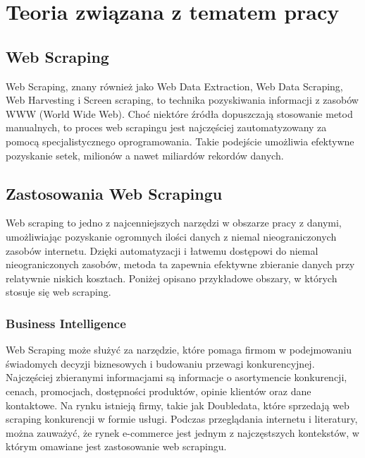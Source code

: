 \newpage

\section{Teoria związana z tematem pracy}\label{sec:teoria}

\subsection{Web Scraping}\label{subsec:web-scraping}

Web Scraping, znany również jako Web Data Extraction, Web Data Scraping, Web Harvesting i Screen scraping, to technika pozyskiwania informacji z zasobów WWW (World Wide Web)\cite{Zhao2017}.
Choć niektóre źródła dopuszczają stosowanie metod manualnych\cite{applications-and-tools}, to proces web scrapingu jest najczęściej zautomatyzowany za pomocą specjalistycznego oprogramowania.
Takie podejście umożliwia efektywne pozyskanie setek, milionów a nawet miliardów rekordów danych.

\subsection{Zastosowania Web Scrapingu}\label{subsec:web-scraping-applications}

Web scraping to jedno z najcenniejszych narzędzi w obszarze pracy z danymi, umożliwiając pozyskanie ogromnych ilości danych z niemal nieograniczonych zasobów internetu\cite{Zhao2017}.
Dzięki automatyzacji i łatwemu dostępowi do niemal nieograniczonych zasobów, metoda ta zapewnia efektywne zbieranie danych przy relatywnie niskich kosztach.
Poniżej opisano przykładowe obszary, w których stosuje się web scraping.

\subsubsection{Business Intelligence}
Web Scraping może służyć za narzędzie, które pomaga firmom w podejmowaniu świadomych decyzji biznesowych i budowaniu przewagi konkurencyjnej.
Najczęściej zbieranymi informacjami są informacje o asortymencie konkurencji, cenach, promocjach, dostępności produktów, opinie klientów oraz dane kontaktowe.
Na rynku istnieją firmy, takie jak Doubledata\cite{doubledata}, które sprzedają web scraping konkurencji w formie usługi.
Podczas przeglądania internetu i literatury, można zauważyć, że rynek e-commerce jest jednym z najczęstszych kontekstów, w którym omawiane jest zastosowanie web scrapingu.

